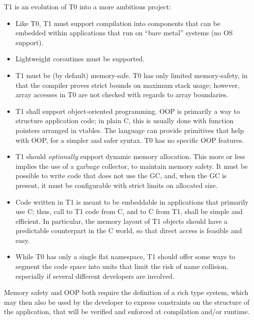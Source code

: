 T1 is an evolution of T0 into a more ambitious project:
\begin{itemize}

    \item Like T0, T1 must support compilation into components that can
    be embedded within applications that run on ``bare metal'' systems
    (no OS support).

    \item Lightweight coroutines must be supported.

    \item T1 must be (by default) memory-safe. T0 has only limited
    memory-safety, in that the compiler proves strict bounds on maximum
    stack usage; however, array accesses in T0 are not checked with
    regards to array boundaries.

    \item T1 shall support object-oriented programming. OOP is primarily
    a way to structure application code; in plain C, this is usually
    done with function pointers arranged in vtables. The language can
    provide primitives that help with OOP, for a simpler and safer
    syntax. T0 has no specific OOP features.

    \item T1 should \emph{optionally} support dynamic memory allocation.
    This more or less implies the use of a garbage collector, to
    maintain memory safety. It must be possible to write code that does
    not use the GC, and, when the GC is present, it must be configurable
    with strict limits on allocated size.

    \item Code written in T1 is meant to be embeddable in applications
    that primarily use C; thus, call to T1 code from C, and to C from
    T1, shall be simple and efficient. In particular, the memory layout
    of T1 objects should have a predictable counterpart in the C world,
    so that direct access is feasible and easy.

    \item While T0 has only a single flat namespace, T1 should offer
    some ways to segment the code space into units that limit the risk
    of name collision, especially if several different developers are
    involved.

\end{itemize}

Memory safety and OOP both require the definition of a rich type system,
which may then also be used by the developer to express constraints on
the structure of the application, that will be verified and enforced at
compilation and/or runtime.

